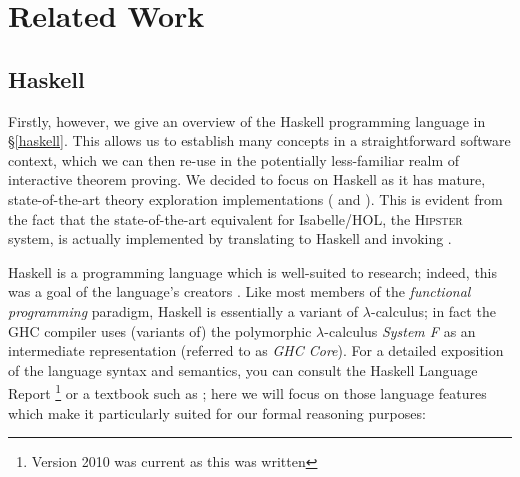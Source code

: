 \section{Related Work}
\label{related}

\subsection{Haskell}
\label{haskelldesc}

Firstly, however, we give an overview of the Haskell programming language in \S \ref{haskell}. This allows us to establish many concepts in a straightforward software context, which we can then re-use in the potentially less-familiar realm of interactive theorem proving. We decided to focus on Haskell as it has mature, state-of-the-art theory exploration implementations (\qspec{} \citep{QuickSpec} and \hspec{} \citep{claessen2013automating}). This is evident from the fact that the state-of-the-art equivalent for Isabelle/HOL, the \textsc{Hipster} \citep{Hipster} system, is actually implemented by translating to Haskell and invoking \hspec{}.

Haskell is a programming language which is well-suited to research; indeed, this was a goal of the language's creators \citep{marlow2010haskell}. Like most members of the \emph{functional programming} paradigm, Haskell is essentially a variant of $\lambda$-calculus; in fact the \textsc{GHC} compiler uses (variants of) the polymorphic $\lambda$-calculus \emph{System F} as an intermediate representation (referred to as \emph{GHC Core}). For a detailed exposition of the language syntax and semantics, you can consult the Haskell Language Report \citep{marlow2010haskell} \footnote{Version 2010 was current as this was written} or a textbook such as \citep{thompson1999haskell}; here we will focus on those language features which make it particularly suited for our formal reasoning purposes:

